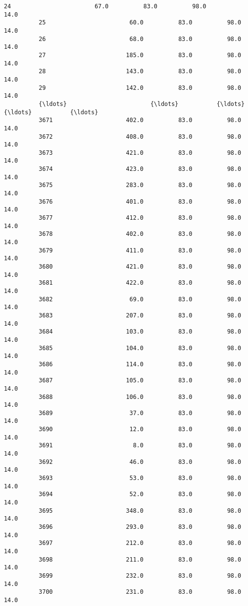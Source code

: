 \documentclass[11pt]{article}
\begin{document}
\begin{Verbatim}[commandchars=\\\{\}]
          24                        67.0          83.0          98.0          14.0   
          25                        60.0          83.0          98.0          14.0   
          26                        68.0          83.0          98.0          14.0   
          27                       185.0          83.0          98.0          14.0   
          28                       143.0          83.0          98.0          14.0   
          29                       142.0          83.0          98.0          14.0   
          {\ldots}                        {\ldots}           {\ldots}           {\ldots}           {\ldots}   
          3671                     402.0          83.0          98.0          14.0   
          3672                     408.0          83.0          98.0          14.0   
          3673                     421.0          83.0          98.0          14.0   
          3674                     423.0          83.0          98.0          14.0   
          3675                     283.0          83.0          98.0          14.0   
          3676                     401.0          83.0          98.0          14.0   
          3677                     412.0          83.0          98.0          14.0   
          3678                     402.0          83.0          98.0          14.0   
          3679                     411.0          83.0          98.0          14.0   
          3680                     421.0          83.0          98.0          14.0   
          3681                     422.0          83.0          98.0          14.0   
          3682                      69.0          83.0          98.0          14.0   
          3683                     207.0          83.0          98.0          14.0   
          3684                     103.0          83.0          98.0          14.0   
          3685                     104.0          83.0          98.0          14.0   
          3686                     114.0          83.0          98.0          14.0   
          3687                     105.0          83.0          98.0          14.0   
          3688                     106.0          83.0          98.0          14.0   
          3689                      37.0          83.0          98.0          14.0   
          3690                      12.0          83.0          98.0          14.0   
          3691                       8.0          83.0          98.0          14.0   
          3692                      46.0          83.0          98.0          14.0   
          3693                      53.0          83.0          98.0          14.0   
          3694                      52.0          83.0          98.0          14.0   
          3695                     348.0          83.0          98.0          14.0   
          3696                     293.0          83.0          98.0          14.0   
          3697                     212.0          83.0          98.0          14.0   
          3698                     211.0          83.0          98.0          14.0   
          3699                     232.0          83.0          98.0          14.0   
          3700                     231.0          83.0          98.0          14.0   
          

\end{Verbatim}
\end{document}
